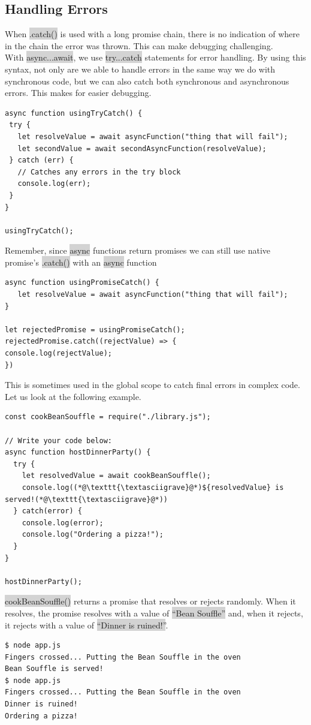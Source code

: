 \documentclass[11pt]{article}
\begin{document}
\subsection{Handling Errors}
When \colorbox{lightgray}{.catch()} is used with a long promise chain, there is no indication of where in the chain the error was thrown. This can make debugging challenging. \\
\newline
With \colorbox{lightgray}{async...await}, we use \colorbox{lightgray}{try...catch} statements for error handling. By using this syntax, not only are we able to handle errors in the same way we do with synchronous code, but we can also catch both synchronous and asynchronous errors. This makes for easier debugging. 
\begin{lstlisting}
async function usingTryCatch() {
 try {
   let resolveValue = await asyncFunction("thing that will fail");
   let secondValue = await secondAsyncFunction(resolveValue);
 } catch (err) {
   // Catches any errors in the try block
   console.log(err);
 }
}

usingTryCatch();
\end{lstlisting}
Remember, since \colorbox{lightgray}{async} functions return promises we can still use native promise’s \colorbox{lightgray}{.catch()} with an \colorbox{lightgray}{async} function
\begin{lstlisting}
async function usingPromiseCatch() {
   let resolveValue = await asyncFunction("thing that will fail");
}

let rejectedPromise = usingPromiseCatch();
rejectedPromise.catch((rejectValue) => {
console.log(rejectValue);
})
\end{lstlisting}
This is sometimes used in the global scope to catch final errors in complex code. Let us look at the following example. 
\begin{lstlisting}
const cookBeanSouffle = require("./library.js");

// Write your code below:
async function hostDinnerParty() {
  try {
    let resolvedValue = await cookBeanSouffle(); 
    console.log((*@\texttt{\textasciigrave}@*)${resolvedValue} is served!(*@\texttt{\textasciigrave}@*))
  } catch(error) {
    console.log(error);
    console.log("Ordering a pizza!"); 
  }
}

hostDinnerParty(); 
\end{lstlisting}
\colorbox{lightgray}{cookBeanSouffle()} returns a promise that resolves or rejects randomly. When it resolves, the promise resolves with a value of \colorbox{lightgray}{``Bean Souffle''} and, when it rejects, it rejects with a value of \colorbox{lightgray}{``Dinner is ruined!''}. 
\begin{lstlisting}[basicstyle=\small\ttfamily\color{theWhite}, backgroundcolor = \color{theBlack}, language = Comment]
$ node app.js
Fingers crossed... Putting the Bean Souffle in the oven
Bean Souffle is served!
$ node app.js
Fingers crossed... Putting the Bean Souffle in the oven
Dinner is ruined!
Ordering a pizza!
\end{lstlisting}
\end{document}
